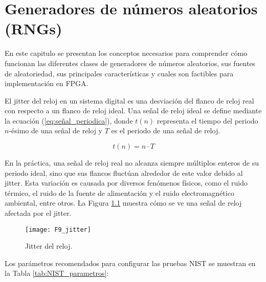 \chapter{Generadores de números aleatorios (RNGs)}

    En este capitulo se presentan los conceptos necesarios para comprender cómo funcionan las diferentes clases de generadores de números aleatorios, sus fuentes de aleatoriedad, sus principales características y cuales son factibles para implementación en FPGA.


El jitter del reloj en un sistema digital es una desviación del flanco de reloj real con respecto a un flanco de reloj ideal. Una señal de reloj ideal se define mediante la ecuación (\ref{eq:señal_periodica}), donde $t(n)$ representa el tiempo del periodo $n$-ésimo de una señal de reloj y $T$ es el periodo de una señal de reloj.

            \begin{equation}
                t(n) = n \cdot T 
                \label{eq:señal_periodica}
            \end{equation}
            
            En la práctica, una señal de reloj real no alcanza siempre múltiplos enteros de su periodo ideal, sino que sus flancos fluctúan alrededor de este valor debido al jitter. Esta variación es causada por diversos fenómenos físicos, como el ruido térmico, el ruido de la fuente de alimentación y el ruido electromagnético ambiental, entre otros. La Figura \ref{fig:F9_jitter} muestra cómo se ve una señal de reloj afectada por el jitter.

            \begin{figure}[hbtp]
                \centering
                \texttt{[image: F9\_jitter]}
                \caption{Jitter del reloj.}
                \label{fig:F9_jitter}
            \end{figure}
            
            
            Los parámetros recomendados para configurar las pruebas NIST se muestran en la Tabla \ref{tab:NIST_parametros}:

